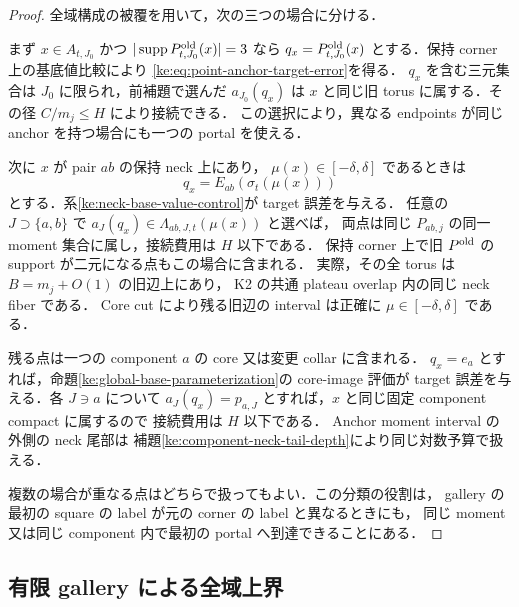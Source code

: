 \begin{proof}
全域構成の被覆を用いて，次の三つの場合に分ける．

まず $x\in A_{t,J_0}$ かつ
$|\operatorname{supp}P^{\rm old}_{t,J_0}(x)|=3$ なら
$q_x=P^{\rm old}_{t,J_0}(x)$ とする．保持 corner 上の基底値比較により
\eqref{ke:eq:point-anchor-target-error}を得る．
$q_x$ を含む三元集合は $J_0$ に限られ，前補題で選んだ $a_{J_0}(q_x)$ は
$x$ と同じ旧 torus に属する．その径 $C/m_j\le H$ により接続できる．
この選択により，異なる endpoints が同じ anchor を持つ場合にも一つの portal を使える．

次に $x$ が pair $ab$ の保持 neck 上にあり，
$\mu(x)\in[-\delta,\delta]$ であるときは
\[
 q_x=E_{ab}(\sigma_t(\mu(x)))
\]
とする．系\ref{ke:neck-base-value-control}が target 誤差を与える．
任意の $J\supset\{a,b\}$ で
$a_J(q_x)\in\Lambda_{ab,J,t}(\mu(x))$ と選べば，
両点は同じ $P_{ab,j}$ の同一 moment 集合に属し，接続費用は $H$ 以下である．
保持 corner 上で旧 $P^{\rm old}$ の support が二元になる点もこの場合に含まれる．
実際，その全 torus は $B=m_j+O(1)$ の旧辺上にあり，
K2 の共通 plateau overlap 内の同じ neck fiber である．
Core cut により残る旧辺の interval は正確に $\mu\in[-\delta,\delta]$ である．

残る点は一つの component $a$ の core 又は変更 collar に含まれる．
$q_x=e_a$ とすれば，命題\ref{ke:global-base-parameterization}の core-image 評価が
target 誤差を与える．各 $J\ni a$ について
$a_J(q_x)=p_{a,J}$ とすれば，$x$ と同じ固定 component compact に属するので
接続費用は $H$ 以下である．
Anchor moment interval の外側の neck 尾部は
補題\ref{ke:component-neck-tail-depth}により同じ対数予算で扱える．

複数の場合が重なる点はどちらで扱ってもよい．この分類の役割は，
gallery の最初の square の label が元の corner の label と異なるときにも，
同じ moment 又は同じ component 内で最初の portal へ到達できることにある．
\end{proof}

\subsection{有限 gallery による全域上界}

